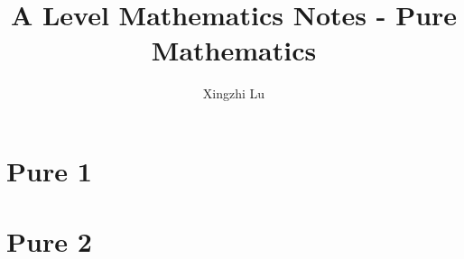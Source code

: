 \documentclass[oneside,fleqn,11pt]{book}
\title{A Level Mathematics Notes - Pure Mathematics}
\author{Xingzhi Lu}
\date{}
\begin{document}
\everymath{\displaystyle}
\maketitle
\tableofcontents

\part{Pure 1}


\part{Pure 2}
\setcounter{chapter}{0}

\end{document}
